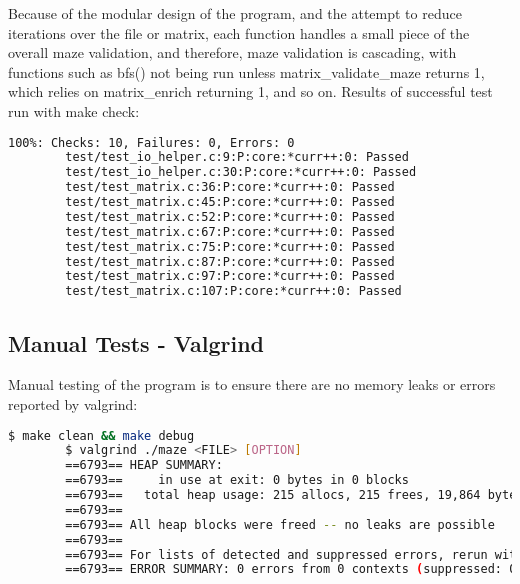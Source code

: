 \documentclass{article}
\begin{document}
    Because of the modular design of the program, and the attempt to reduce iterations over the file or matrix, each function handles a small piece of the overall maze validation, and therefore, maze validation is cascading, with functions such as bfs() not being run unless matrix\_validate\_maze returns 1, which relies on matrix\_enrich returning 1, and so on.
    Results of successful test run with make check:
    \begin{lstlisting}[language=bash]
        100%: Checks: 10, Failures: 0, Errors: 0
        test/test_io_helper.c:9:P:core:*curr++:0: Passed
        test/test_io_helper.c:30:P:core:*curr++:0: Passed
        test/test_matrix.c:36:P:core:*curr++:0: Passed
        test/test_matrix.c:45:P:core:*curr++:0: Passed
        test/test_matrix.c:52:P:core:*curr++:0: Passed
        test/test_matrix.c:67:P:core:*curr++:0: Passed
        test/test_matrix.c:75:P:core:*curr++:0: Passed
        test/test_matrix.c:87:P:core:*curr++:0: Passed
        test/test_matrix.c:97:P:core:*curr++:0: Passed
        test/test_matrix.c:107:P:core:*curr++:0: Passed        
    \end{lstlisting}

    \subsection{Manual Tests - Valgrind}
    Manual testing of the program is to ensure there are no memory leaks or errors reported by valgrind:
        \begin{lstlisting}[language=bash]
        $ make clean && make debug
        $ valgrind ./maze <FILE> [OPTION]
        ==6793== HEAP SUMMARY:
        ==6793==     in use at exit: 0 bytes in 0 blocks
        ==6793==   total heap usage: 215 allocs, 215 frees, 19,864 bytes allocated
        ==6793== 
        ==6793== All heap blocks were freed -- no leaks are possible
        ==6793== 
        ==6793== For lists of detected and suppressed errors, rerun with: -s
        ==6793== ERROR SUMMARY: 0 errors from 0 contexts (suppressed: 0 from 0)

        \end{lstlisting}
\end{document}

